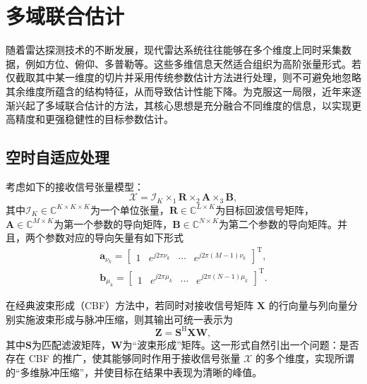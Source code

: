 \section{多域联合估计}
随着雷达探测技术的不断发展，现代雷达系统往往能够在多个维度上同时采集数据，例如方位、俯仰、多普勒等。这些多维信息天然适合组织为高阶张量形式。若仅截取其中某一维度的切片并采用传统参数估计方法进行处理，则不可避免地忽略其余维度所蕴含的结构特征，从而导致估计性能下降。为克服这一局限，近年来逐渐兴起了多域联合估计的方法，其核心思想是充分融合不同维度的信息，以实现更高精度和更强稳健性的目标参数估计。

\subsection{空时自适应处理}
考虑如下的接收信号张量模型：
\[
    \mathcal{X} = \mathcal{I}_{K} \times_1 \mathbf{R} \times_2 \mathbf{A} \times_3 \mathbf{B},
\]
其中\( \mathcal{I}_{K} \in \mathbb{C}^{K \times K \times K} \)为一个单位张量，\( \mathbf{R} \in \mathbb{C}^{L \times K} \)为目标回波信号矩阵，\( \mathbf{A} \in \mathbb{C}^{M \times K} \)为第一个参数的导向矩阵，\( \mathbf{B} \in \mathbb{C}^{N \times K} \)为第二个参数的导向矩阵。并且，两个参数对应的导向矢量有如下形式
\[
    \begin{split}
        \bm{a}_{\nu_k} = \begin{bmatrix}
                             1 & e^{j2\pi\nu_k} & \cdots & e^{j2\pi(M-1)\nu_k}
                         \end{bmatrix}^{\mathrm{T}}, \\
        \bm{b}_{\mu_k} = \begin{bmatrix}
                             1 & e^{j2\pi\mu_k} & \cdots & e^{j2\pi(N-1)\mu_k}
                         \end{bmatrix}^{\mathrm{T}}.
    \end{split}
\]

在经典波束形成（CBF）方法中，若同时对接收信号矩阵 \( \mathbf{X} \) 的行向量与列向量分别实施波束形成与脉冲压缩，则其输出可统一表示为
\[
    \mathbf{Z} = \mathbf{S}^{\mathrm{H}} \mathbf{X} \mathbf{W},
\]
其中\( \mathbf{S}  \)为匹配滤波矩阵，\( \mathbf{W} \)为``波束形成''矩阵。这一形式自然引出一个问题：是否存在 CBF 的推广，使其能够同时作用于接收信号张量 \( \mathcal{X} \) 的多个维度，实现所谓的“多维脉冲压缩”，并使目标在结果中表现为清晰的峰值。

